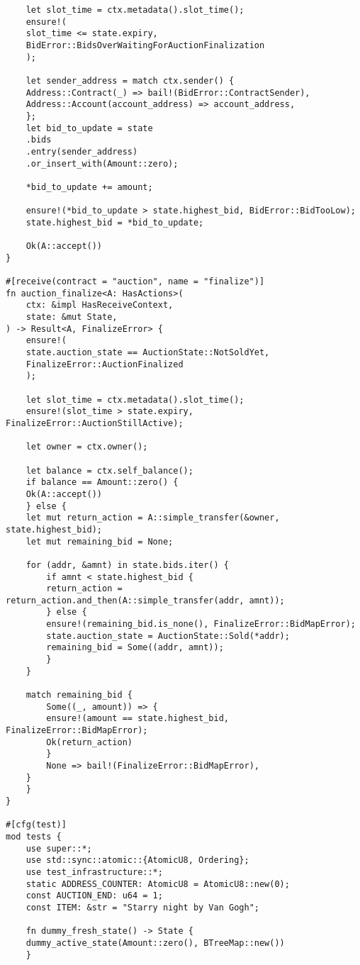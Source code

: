 \documentclass[11pt]{article}
\begin{document}
\begin{verbatim}
    let slot_time = ctx.metadata().slot_time();
    ensure!(
	slot_time <= state.expiry,
	BidError::BidsOverWaitingForAuctionFinalization
    );

    let sender_address = match ctx.sender() {
	Address::Contract(_) => bail!(BidError::ContractSender),
	Address::Account(account_address) => account_address,
    };
    let bid_to_update = state
	.bids
	.entry(sender_address)
	.or_insert_with(Amount::zero);

    *bid_to_update += amount;

    ensure!(*bid_to_update > state.highest_bid, BidError::BidTooLow);
    state.highest_bid = *bid_to_update;

    Ok(A::accept())
}

#[receive(contract = "auction", name = "finalize")]
fn auction_finalize<A: HasActions>(
    ctx: &impl HasReceiveContext,
    state: &mut State,
) -> Result<A, FinalizeError> {
    ensure!(
	state.auction_state == AuctionState::NotSoldYet,
	FinalizeError::AuctionFinalized
    );

    let slot_time = ctx.metadata().slot_time();
    ensure!(slot_time > state.expiry, FinalizeError::AuctionStillActive);

    let owner = ctx.owner();

    let balance = ctx.self_balance();
    if balance == Amount::zero() {
	Ok(A::accept())
    } else {
	let mut return_action = A::simple_transfer(&owner, state.highest_bid);
	let mut remaining_bid = None;

	for (addr, &amnt) in state.bids.iter() {
	    if amnt < state.highest_bid {
		return_action = return_action.and_then(A::simple_transfer(addr, amnt));
	    } else {
		ensure!(remaining_bid.is_none(), FinalizeError::BidMapError);
		state.auction_state = AuctionState::Sold(*addr);
		remaining_bid = Some((addr, amnt));
	    }
	}

	match remaining_bid {
	    Some((_, amount)) => {
		ensure!(amount == state.highest_bid, FinalizeError::BidMapError);
		Ok(return_action)
	    }
	    None => bail!(FinalizeError::BidMapError),
	}
    }
}

#[cfg(test)]
mod tests {
    use super::*;
    use std::sync::atomic::{AtomicU8, Ordering};
    use test_infrastructure::*;
    static ADDRESS_COUNTER: AtomicU8 = AtomicU8::new(0);
    const AUCTION_END: u64 = 1;
    const ITEM: &str = "Starry night by Van Gogh";

    fn dummy_fresh_state() -> State {
	dummy_active_state(Amount::zero(), BTreeMap::new())
    }


\end{verbatim}
\end{document}
